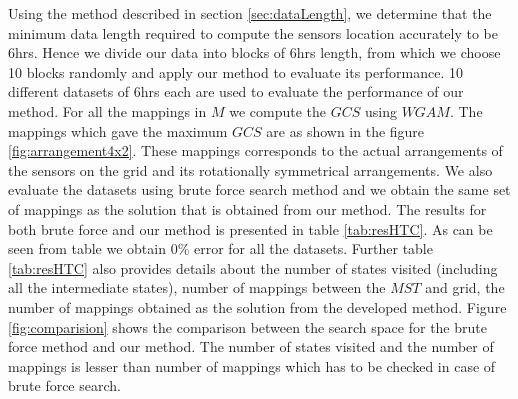 Using the method described in section \ref{sec:dataLength}, we determine that the minimum data length required to compute the sensors location accurately to be 6hrs.
Hence we divide our data into blocks of 6hrs length, from which we choose 10 blocks randomly and apply our method to evaluate its performance.
10 different datasets of 6hrs each are used to evaluate the performance of our method.
For all the mappings in $M$ we compute the $GCS$ using $WGAM$. The mappings which gave the maximum $GCS$ are as shown in the figure \ref{fig:arrangement4x2}.
These mappings corresponds to the actual arrangements of the sensors on the grid and its rotationally symmetrical arrangements.
We also evaluate the datasets using brute force search method and we obtain the same set of mappings as the solution that is obtained from our method. The results for both brute force and our method is presented in table \ref{tab:resHTC}.
As can be seen from table we obtain 0\% error for all the datasets. 
Further table \ref{tab:resHTC} also provides details about the number of states visited (including all the intermediate states), number of mappings between the $MST$ and grid, the number of mappings obtained as the solution from the developed method. 
Figure \ref{fig:comparision} shows the comparison between the search space for the brute force method and our method. 
The number of states visited and the number of mappings is lesser than number of  mappings which has to be checked in case of brute force search. 
